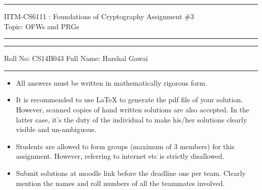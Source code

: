 \documentclass[11pt]{exam}
\begin{document}

\hrule
\vspace{3mm}
\noindent
{\sf IITM-CS6111 : Foundations of Cryptography  \hfill Assignment \#3 }
\vspace{3mm} \\
\noindent
{\sf Topic: OFWs and PRGs\hfill}
\vspace{3mm}
\hrule

\hrule
\vspace{3mm}
\noindent
{\sf Roll No: CS14B043 \hfill Full Name: Harshal Gawai} 
\vspace{3mm}
\hrule

{\small 
\begin{itemize}
\itemsep 0pt
\item All answers must be written in mathematically rigorous form.
\item It is recommended to use LaTeX to generate the pdf file of your solution. However, scanned copies of hand written solutions are also accepted. In the latter case, it's the duty of the individual to make his/her solutions clearly visible and un-ambiguous.
\item Students are allowed to form groups (maximum of $3$ members) for this assignment. However, referring to internet etc is strictly disallowed.
\item Submit solutions at moodle link before the deadline one per team. Clearly mention the names and roll numbers of all the teammates involved.
\end{itemize}
}
\end{document}
